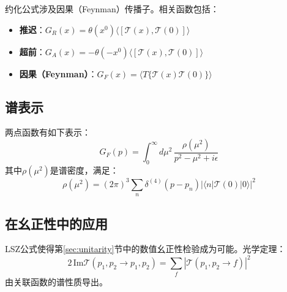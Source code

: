 约化公式涉及因果（Feynman）传播子。相关函数包括：

\begin{itemize}
    \item \textbf{推迟}：$G_R(x) = \theta(x^0) \langle [\mathcal{T}(x), \mathcal{T}(0)] \rangle$
    \item \textbf{超前}：$G_A(x) = -\theta(-x^0) \langle [\mathcal{T}(x), \mathcal{T}(0)] \rangle$
    \item \textbf{因果（Feynman）}：$G_F(x) = \langle T\{\mathcal{T}(x)\mathcal{T}(0)\} \rangle$
\end{itemize}

\subsection{谱表示}

\begin{theorem}
两点函数有如下表示：
\begin{equation}
    G_F(p) = \int_0^\infty d\mu^2 \, \frac{\rho(\mu^2)}{p^2 - \mu^2 + i\epsilon}
\end{equation}
其中$\rho(\mu^2)$是谱密度，满足：
\begin{equation}
    \rho(\mu^2) = (2\pi)^3 \sum_n \delta^{(4)}(p - p_n) |\langle n | \mathcal{T}(0) | 0 \rangle|^2
\end{equation}
\end{theorem}

\subsection{在幺正性中的应用}

LSZ公式使得第\ref{sec:unitarity}节中的数值幺正性检验成为可能。光学定理：
\begin{equation}
    2 \, \text{Im} \mathcal{T}(p_1, p_2 \to p_1, p_2) = \sum_f |\mathcal{T}(p_1, p_2 \to f)|^2
\end{equation}
由关联函数的谱性质导出。

